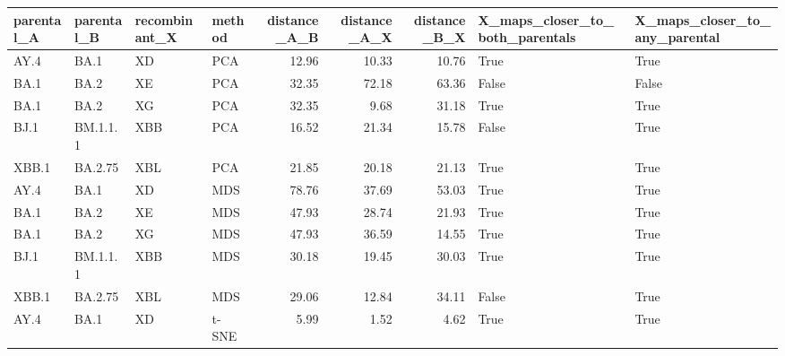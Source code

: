 \begin{tabular}{llllrrrll}
\toprule
parental\_A & parental\_B & recombinant\_X & method &  distance\_A\_B &  distance\_A\_X &  distance\_B\_X &  X\_maps\_closer\_to\_both\_parentals &  X\_maps\_closer\_to\_any\_parental \\
\midrule
      AY.4 &       BA.1 &            XD &    PCA &         12.96 &         10.33 &         10.76 &                             True &                           True \\
      BA.1 &       BA.2 &            XE &    PCA &         32.35 &         72.18 &         63.36 &                            False &                          False \\
      BA.1 &       BA.2 &            XG &    PCA &         32.35 &          9.68 &         31.18 &                             True &                           True \\
      BJ.1 &   BM.1.1.1 &           XBB &    PCA &         16.52 &         21.34 &         15.78 &                            False &                           True \\
     XBB.1 &    BA.2.75 &           XBL &    PCA &         21.85 &         20.18 &         21.13 &                             True &                           True \\
      AY.4 &       BA.1 &            XD &    MDS &         78.76 &         37.69 &         53.03 &                             True &                           True \\
      BA.1 &       BA.2 &            XE &    MDS &         47.93 &         28.74 &         21.93 &                             True &                           True \\
      BA.1 &       BA.2 &            XG &    MDS &         47.93 &         36.59 &         14.55 &                             True &                           True \\
      BJ.1 &   BM.1.1.1 &           XBB &    MDS &         30.18 &         19.45 &         30.03 &                             True &                           True \\
     XBB.1 &    BA.2.75 &           XBL &    MDS &         29.06 &         12.84 &         34.11 &                            False &                           True \\
      AY.4 &       BA.1 &            XD &  t-SNE &          5.99 &          1.52 &          4.62 &                             True &                           True \\

\end{tabular}
